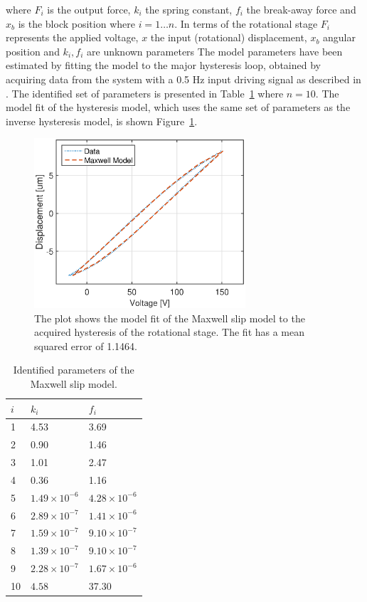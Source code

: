 where $F_i$ is the output force, $k_i$ the spring constant, $f_i$ the break-away force and $x_b$ is the block position where $i=1 \hdots n$. In terms of the rotational stage $F_i$ represents the applied voltage, $x$ the input (rotational) displacement, $x_b$ angular position and $k_i, f_i$ are unknown parameters
The model parameters have been estimated by fitting the model to the major hysteresis loop, obtained by acquiring data from the system with a 0.5 Hz input driving signal as described in \citep{ButcherIdentification:2015,ButcherController:2015}. The identified set of parameters is presented in Table~\ref{tab:maxwell} where $n=10$. The model fit of the hysteresis model, which uses the same set of parameters as the inverse hysteresis model, is shown Figure~\ref{fig:maxwell}.

\begin{figure}[h]
  \centering
  \includegraphics[width=0.7\textwidth]{fig/matlab/maxwell.eps}
  \caption{\label{fig:maxwell} The plot shows the model fit of the Maxwell slip model to the acquired hysteresis of the rotational stage. The fit has a mean squared error of 1.1464.}
\end{figure}

\begin{table}[h!]
  \centering
  \begin{tabular}{| l | l | l |}
    \hline
    $i$ & $k_i$ & $f_i$ \\ \hline
    1 & 4.53 & 3.69 \\
    2 & 0.90 & 1.46 \\
    3 & 1.01 & 2.47 \\
    4 & 0.36 & 1.16 \\
    5 & $1.49 \times 10^{-6}$ & $4.28 \times 10^{-6}$ \\
    6 & $2.89 \times 10^{-7}$ & $1.41 \times 10^{-6}$ \\
    7 & $1.59 \times 10^{-7}$ & $9.10 \times 10^{-7}$ \\
    8 & $1.39 \times 10^{-7}$ & $9.10 \times 10^{-7}$ \\
    9 & $2.28 \times 10^{-7}$ & $1.67 \times 10^{-6}$ \\
    10 & $4.58$ & 37.30 \\
    \hline
  \end{tabular}
  \caption{\label{tab:maxwell} Identified parameters of the Maxwell slip model.}
\end{table}

